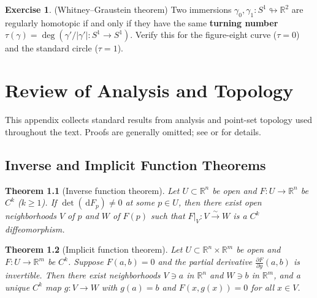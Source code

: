 \documentclass[12pt,a4paper,openany]{book}
\newtheorem{theorem}{Theorem}[section]
\theoremstyle{definition}
\newtheorem{exercise}{Exercise}[chapter]
\theoremstyle{remark}
\newcommand{\R}{\mathbb{R}}
\newcommand{\dd}{\,\mathrm{d}}
\newcommand{\abs}[1]{\left\lvert #1 \right\rvert}
\begin{document}
\begin{exercise}\label{exo:whitney-9}
(Whitney--Graustein theorem)
Two immersions $\gamma_0,\gamma_1\colon S^1\looparrowright\R^2$ are
regularly homotopic if and only if they have the same
\textbf{turning number} $\tau(\gamma) = \deg(\gamma'/\abs{\gamma'}\colon S^1\to S^1)$.
Verify this for the figure-eight curve ($\tau=0$) and the standard
circle ($\tau=1$).
\end{exercise}



\appendix


\chapter{Review of Analysis and Topology}\label{app:analysis}

This appendix collects standard results from analysis and point-set
topology used throughout the text. Proofs are generally omitted;
see \cite{lee-smooth} or \cite{rudin-analysis} for details.

\section{Inverse and Implicit Function Theorems}\label{sec:app-ift}

\begin{theorem}[Inverse function theorem]\label{thm:app-ift}
Let $U \subset \R^n$ be open and $F\colon U \to \R^n$ be $C^k$
($k \ge 1$). If $\det(\dd F_p) \neq 0$ at some $p \in U$, then there
exist open neighborhoods $V$ of $p$ and $W$ of $F(p)$ such that
$F|_V\colon V \xrightarrow{\sim} W$ is a $C^k$ diffeomorphism.
\end{theorem}

\begin{theorem}[Implicit function theorem]\label{thm:app-implicit}
Let $U \subset \R^n\times\R^m$ be open and $F\colon U \to \R^m$ be $C^k$.
Suppose $F(a,b)=0$ and the partial derivative $\frac{\partial F}{\partial y}(a,b)$
is invertible. Then there exist neighborhoods $V\ni a$ in $\R^n$ and
$W\ni b$ in $\R^m$, and a unique $C^k$ map $g\colon V\to W$ with
$g(a)=b$ and $F(x,g(x))=0$ for all $x\in V$.
\end{theorem}
\end{document}
